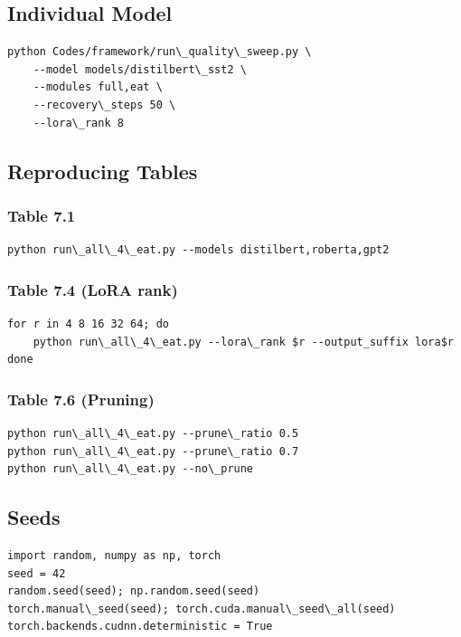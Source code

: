 \subsection{Individual Model}

\begin{lstlisting}
python Codes/framework/run\_quality\_sweep.py \
    --model models/distilbert\_sst2 \
    --modules full,eat \
    --recovery\_steps 50 \
    --lora\_rank 8
\end{lstlisting}

\subsection{Reproducing Tables}

\subsubsection{Table 7.1}

\begin{lstlisting}
python run\_all\_4\_eat.py --models distilbert,roberta,gpt2
\end{lstlisting}

\subsubsection{Table 7.4 (LoRA rank)}

\begin{lstlisting}
for r in 4 8 16 32 64; do
    python run\_all\_4\_eat.py --lora\_rank $r --output_suffix lora$r
done
\end{lstlisting}

\subsubsection{Table 7.6 (Pruning)}

\begin{lstlisting}
python run\_all\_4\_eat.py --prune\_ratio 0.5
python run\_all\_4\_eat.py --prune\_ratio 0.7
python run\_all\_4\_eat.py --no\_prune
\end{lstlisting}

\subsection{Seeds}

\begin{lstlisting}
import random, numpy as np, torch
seed = 42
random.seed(seed); np.random.seed(seed)
torch.manual\_seed(seed); torch.cuda.manual\_seed\_all(seed)
torch.backends.cudnn.deterministic = True
\end{lstlisting}

